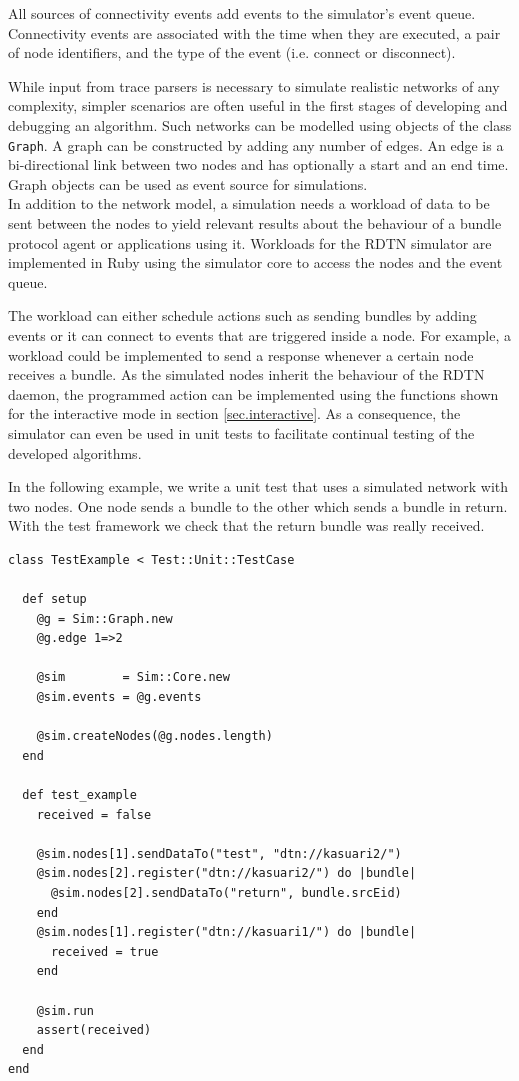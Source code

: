 \documentclass[a4paper]{article}
\begin{document}
All sources of connectivity events add events to the simulator's event queue.
Connectivity events are associated with the time when
they are executed, a pair of node identifiers, and the type of the event (i.e.
connect or disconnect).

While input from trace parsers is necessary to simulate realistic networks of
any complexity, simpler scenarios are often useful in the first stages of
developing and debugging an algorithm. Such networks can be modelled using
objects of the class {\tt Graph}. A graph can be constructed by adding any
number of edges. An edge is a bi-directional link between two nodes and has
optionally a start and an end time. Graph objects can be used as event source
for simulations.\\

In addition to the network model, a simulation needs a workload of data to be
sent between the nodes to yield relevant results about the behaviour of a bundle
protocol agent or applications using it. Workloads for the RDTN simulator are
implemented in Ruby using the simulator core to access the nodes and the event
queue. 

The workload can either schedule actions such as sending bundles by adding
events or it can connect to events that are triggered inside a node. For
example, a workload could be implemented to send a response whenever a certain
node receives a bundle. As the simulated nodes inherit the behaviour of the RDTN
daemon, the programmed action can be implemented using the functions shown for
the interactive mode in section \ref{sec.interactive}. As a consequence, the
simulator can even be used in unit tests to facilitate continual testing of the
developed algorithms.

In the following example, we write a unit test that uses a simulated network
with two nodes. One node sends a bundle to the other which sends a bundle in
return. With the test framework we check that the return bundle was really
received.

\begin{verbatim}
class TestExample < Test::Unit::TestCase

  def setup
    @g = Sim::Graph.new
    @g.edge 1=>2

    @sim        = Sim::Core.new
    @sim.events = @g.events

    @sim.createNodes(@g.nodes.length)
  end

  def test_example
    received = false

    @sim.nodes[1].sendDataTo("test", "dtn://kasuari2/")
    @sim.nodes[2].register("dtn://kasuari2/") do |bundle|
      @sim.nodes[2].sendDataTo("return", bundle.srcEid)
    end
    @sim.nodes[1].register("dtn://kasuari1/") do |bundle|
      received = true
    end

    @sim.run
    assert(received)
  end
end
\end{verbatim}
\end{document}
